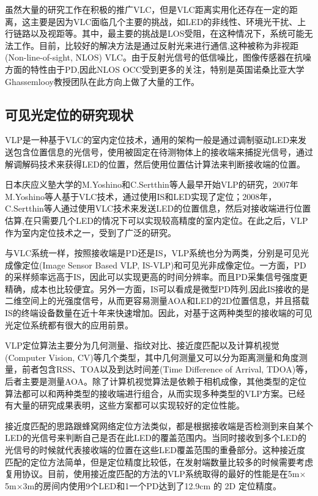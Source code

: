 虽然大量的研究工作在积极的推广VLC，但是VLC距离实用化还存在一定的距离，这主要是因为VLC面临几个主要的挑战，如LED的非线性、环境光干扰、上行链路以及视距等\cite{vlc-challenges}。其中，最主要的挑战是LOS受阻，在这种情况下，系统可能无法工作。目前，比较好的解决方法是通过反射光来进行通信,这种被称为非视距(Non-line-of-sight, NLOS) VLC。由于反射光信号的低信噪比，图像传感器在抗噪方面的特性由于PD,因此NLOS OCC受到更多的关注，特别是英国诺桑比亚大学Ghassemlooy教授团队在此方向上做了大量的工作\cite{vlc-nlos-1,vlc-nlos-2}。


\subsection{可见光定位的研究现状}
VLP是一种基于VLC的室内定位技术，通用的架构一般是通过调制驱动LED来发送包含位置信息的光信号，使用被固定在待测物体上的接收端来捕捉光信号，通过解调解码技术来获得LED的位置，然后使用位置估计算法来判断接收端的位置。

日本庆应义塾大学的M.Yoshino和C.Sertthin等人最早开始VLP的研究，2007年M.Yoshino等人基于VLC技术，通过使用IS和LED实现了定位\cite{is-first-1,is-first-2}；2008年，C.Sertthin等人通过使用VLC技术来发送LED的位置信息，然后对接收端进行位置估算\cite{vlp-01-cs,vlp-02-cs},在只需要几个LED的情况下可以实现较高精度的室内定位。在此之后，VLP作为室内定位技术之一，受到了广泛的研究。

与VLC系统一样，按照接收端是PD还是IS，VLP系统也分为两类，分别是可见光成像定位(Image Sensor Based VLP, IS-VLP)和可见光非成像定位。一方面，PD的采样频率远高于IS，因此可以实现更高的时间分辨率。而且PD采集信号强度更精确，成本也比较便宜。另外一方面，IS可以看成是微型PD阵列,因此IS接收的是二维空间上的光强度信号，从而更容易测量AOA和LED的2D位置信息，并且搭载IS的终端设备数量在近十年来快速增加。因此，对基于这两种类型的接收端的可见光定位系统都有很大的应用前景。

VLP定位算法主要分为几何测量、指纹对比、接近度匹配以及计算机视觉(Computer Vision, CV)等几个类型，其中几何测量又可以分为距离测量和角度测量，前者包含RSS、TOA以及到达时间差(Time Difference of Arrival, TDOA)等，后者主要是测量AOA。除了计算机视觉算法是依赖于相机成像，其他类型的定位算法都可以和两种类型的接收端进行组合，从而实现多种类型的VLP方案\cite{vlp-class-cn}。已经有大量的研究成果表明，这些方案都可以实现较好的定位性能\cite{vlp-luo-2017-review}。

接近度匹配的思路跟蜂窝网络定位方法类似，都是根据接收端是否检测到来自某个LED的光信号来判断自己是否在此LED的覆盖范围内。当同时接收到多个LED的光信号的时候就代表接收端的位置在这些LED覆盖范围的重叠部分。这种接近度匹配的定位方法简单，但是定位精度比较低，在发射端数量比较多的时候需要考虑复用协议。目前，使用接近度匹配的方法的VLP系统取得的最好的性能是在5m$\times$5m$\times$3m的房间内使用9个LED和1一个PD达到了12.9cm 的 2D 定位精度\cite{proximity-12.9cm}。

